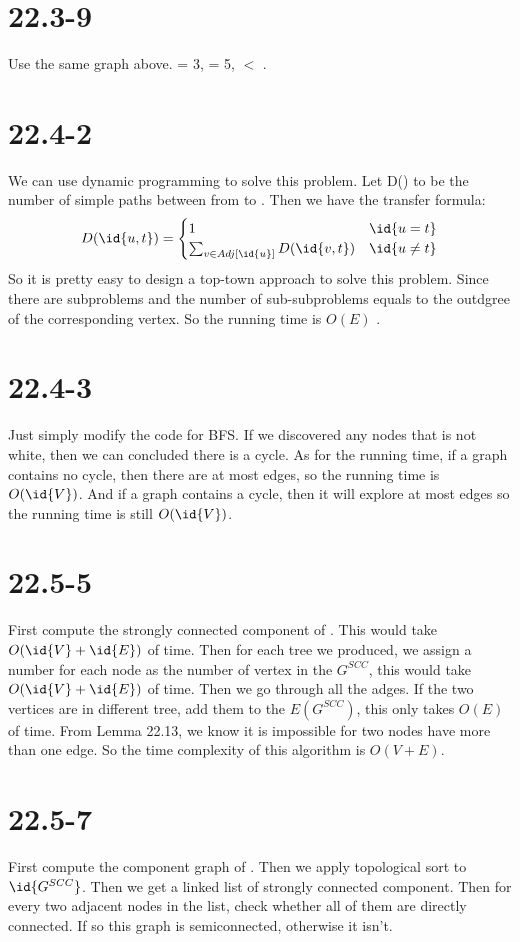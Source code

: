 \documentclass[a4paper]{article}
\begin{document}
 \section*{22.3-9}
 Use the same graph above.  = 3,  = 5,
   $<$ .

\section*{22.4-2}
We can use dynamic programming to solve this problem. Let
D() to be the number of simple paths between from
 to . Then we have the transfer formula:\\
$$D(\id{u,t}) =
\begin{cases}
1& \id{u = t} \\
\sum_{v\in Adj[\id{u}]} D(\id{v,t})& \id{u \not= t}

\end{cases}$$
So it is pretty easy to design a top-town approach to solve
this problem. Since there are  subproblems and the number
of sub-subproblems equals to the outdgree of the corresponding
vertex. So the running time is $O(E)$ .
\section*{22.4-3}
Just simply modify the code for BFS. If we discovered any nodes that
is not white, then we can concluded there is a cycle. As for the
running time, if a graph contains no cycle, then there are at most
 edges, so the running time is $O(\id{V})$. And if a graph
contains a cycle, then it will explore at most  edges so the
running time is still $O(\id{V})$.
\section*{22.5-5}
First compute the strongly connected component of . This would
take $O(\id{V}+\id{E})$ of time. Then for each tree we produced, we assign
a number for each node as the number of vertex in the $G^{SCC}$, this would take $O(\id{V}+\id{E})$ of time. Then we
go through all the adges. If the two vertices are in different tree, add them to
the $E(G^{SCC})$, this only takes $O(E)$ of time. From Lemma 22.13, we know it is impossible for two nodes have more than one edge.
So the time complexity of this algorithm is $O(V+E)$.
\section*{22.5-7}
First compute the component graph of . Then we apply topological sort to $\id{G^{SCC}}$.
Then we get a linked list of strongly connected component. Then for every two adjacent nodes in the list,
check whether all of them are directly connected. If so this graph is semiconnected, otherwise it isn't.
\end{document}
